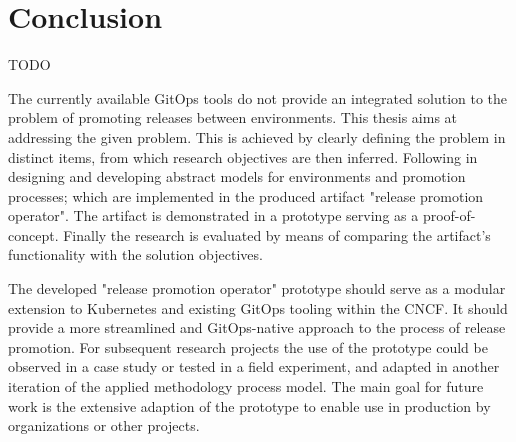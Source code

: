 \chapter{Conclusion}

TODO


%
%
%
%

\noindent
The currently available GitOps tools
do not provide an integrated solution to
the problem of promoting releases between environments.
This thesis aims at addressing the given problem.
This is achieved by
clearly defining the problem in distinct items,
from which research objectives are then inferred.
Following in designing and developing abstract models for
environments and promotion processes;
which are implemented in the produced artifact "release promotion operator".
The artifact is demonstrated in a prototype serving as a proof-of-concept.
Finally the research is evaluated by means of
comparing the artifact's functionality with the solution objectives.
\bigskip

\noindent
The developed "release promotion operator" prototype should serve as
a modular extension to Kubernetes and existing GitOps tooling within the CNCF.
It should provide a more streamlined and GitOps-native approach
to the process of release promotion.
For subsequent research projects the use of the prototype could
be observed in a case study or tested in a field experiment,
and adapted in another iteration of the applied methodology process model.
The main goal for future work is the extensive adaption of the prototype
to enable use in production by organizations or other projects.













